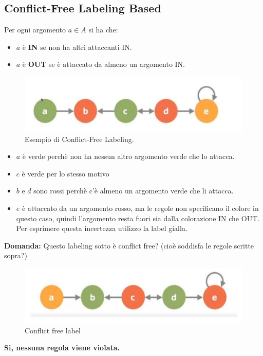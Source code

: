\subsection{Conflict-Free Labeling Based}
Per ogni argomento $a \in A$ si ha che:
\begin{itemize}
    \item $a$ è \textbf{IN} se non ha altri attaccanti IN.
    \item $a$ è \textbf{OUT} se è attaccato da almeno un argomento IN.
\end{itemize}
\begin{figure}[htp]
	\centering
    \includegraphics[width=12cm, keepaspectratio]{img/Cap7/CF.png}
    \caption{Esempio di Conflict-Free Labeling.}
\end{figure}
\begin{itemize}
    \item $a$ è verde perchè non ha nessun altro argomento verde che lo attacca.
    \item $c$ è verde per lo stesso motivo
    \item $b$ e $d$ sono rossi perchè c’è almeno un argomento verde che li attacca.
    \item $e$ è attaccato da un argomento rosso, ma le regole non specificano il colore in questo caso, quindi l’argomento resta fuori sia dalla colorazione IN che OUT. Per esprimere questa incertezza utilizzo la label gialla.
\end{itemize}
\textbf{Domanda: } Questo labeling sotto è conflict free? (cioè soddisfa le regole scritte sopra?)
\begin{figure}[htp]
	\centering
    \includegraphics[width=12cm, keepaspectratio]{img/Cap7/CF2.png}
    \caption{Conflict free label}
\end{figure}
\begin{center}
    \textbf{Si, nessuna regola viene violata.}
\end{center}
